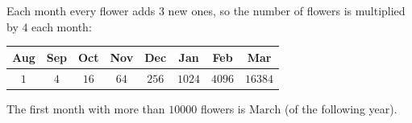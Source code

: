 Each month every flower adds $3$ new ones, so the number of flowers is multiplied by $4$ each month:
\begin{center}
\begin{tabular}{cccccccc}
Aug & Sep & Oct & Nov & Dec & Jan & Feb & Mar\\\hline
$1$ & $4$ & $16$ & $64$ & $256$ & $1024$ & $4096$ & $16384$
\end{tabular}
\end{center}
The first month with more than $10000$ flowers is $\boxed{\text{March}}$ (of the following year).
